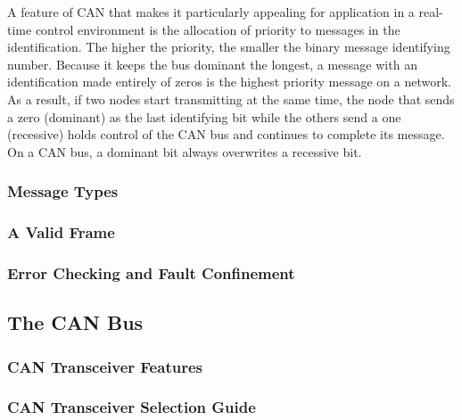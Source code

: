 A feature of CAN that makes it particularly appealing for application in a real-time control environment is the allocation of priority to messages in the identification. The higher the priority, the smaller the binary message identifying number. Because it keeps the bus dominant the longest, a message with an identification made entirely of zeros is the highest priority message on a network. As a result, if two nodes start transmitting at the same time, the node that sends a zero (dominant) as the last identifying bit while the others send a one (recessive) holds control of the CAN bus and continues to complete its message. On a CAN bus, a dominant bit always overwrites a recessive bit.

\subsubsection{Message Types}
\subsubsection{A Valid Frame}
\subsubsection{Error Checking and Fault Confinement}
\subsection{The CAN Bus}
\subsubsection{CAN Transceiver Features}
\subsubsection{CAN Transceiver Selection Guide }



 